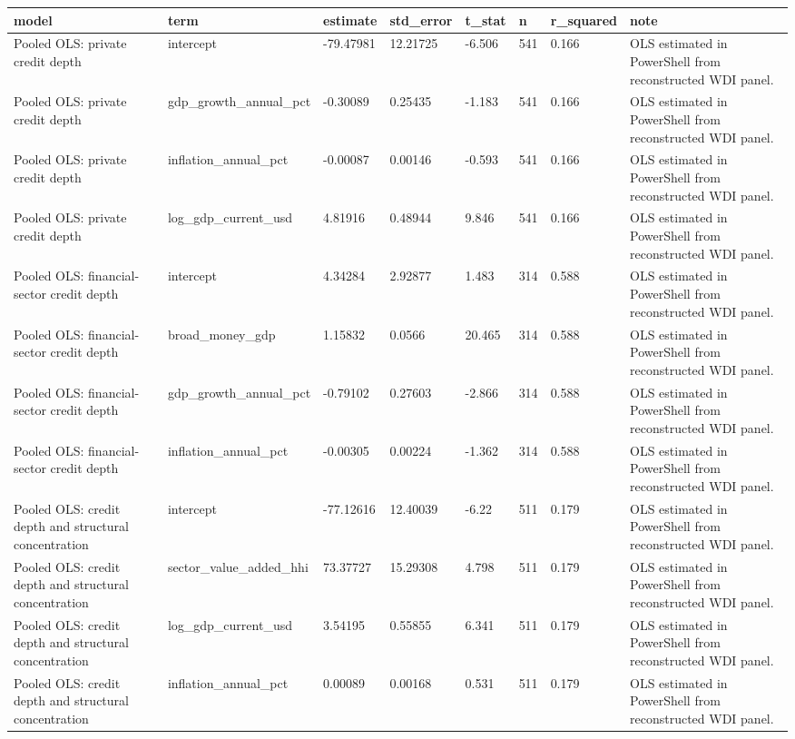﻿%
\begin{tabular}{llllllll}
\hline
model & term & estimate & std_error & t_stat & n & r_squared & note \\
\hline
Pooled OLS: private credit depth & intercept & -79.47981 & 12.21725 & -6.506 & 541 & 0.166 & OLS estimated in PowerShell from reconstructed WDI panel. \\
Pooled OLS: private credit depth & gdp\_growth\_annual\_pct & -0.30089 & 0.25435 & -1.183 & 541 & 0.166 & OLS estimated in PowerShell from reconstructed WDI panel. \\
Pooled OLS: private credit depth & inflation\_annual\_pct & -0.00087 & 0.00146 & -0.593 & 541 & 0.166 & OLS estimated in PowerShell from reconstructed WDI panel. \\
Pooled OLS: private credit depth & log\_gdp\_current\_usd & 4.81916 & 0.48944 & 9.846 & 541 & 0.166 & OLS estimated in PowerShell from reconstructed WDI panel. \\
Pooled OLS: financial-sector credit depth & intercept & 4.34284 & 2.92877 & 1.483 & 314 & 0.588 & OLS estimated in PowerShell from reconstructed WDI panel. \\
Pooled OLS: financial-sector credit depth & broad\_money\_gdp & 1.15832 & 0.0566 & 20.465 & 314 & 0.588 & OLS estimated in PowerShell from reconstructed WDI panel. \\
Pooled OLS: financial-sector credit depth & gdp\_growth\_annual\_pct & -0.79102 & 0.27603 & -2.866 & 314 & 0.588 & OLS estimated in PowerShell from reconstructed WDI panel. \\
Pooled OLS: financial-sector credit depth & inflation\_annual\_pct & -0.00305 & 0.00224 & -1.362 & 314 & 0.588 & OLS estimated in PowerShell from reconstructed WDI panel. \\
Pooled OLS: credit depth and structural concentration & intercept & -77.12616 & 12.40039 & -6.22 & 511 & 0.179 & OLS estimated in PowerShell from reconstructed WDI panel. \\
Pooled OLS: credit depth and structural concentration & sector\_value\_added\_hhi & 73.37727 & 15.29308 & 4.798 & 511 & 0.179 & OLS estimated in PowerShell from reconstructed WDI panel. \\
Pooled OLS: credit depth and structural concentration & log\_gdp\_current\_usd & 3.54195 & 0.55855 & 6.341 & 511 & 0.179 & OLS estimated in PowerShell from reconstructed WDI panel. \\
Pooled OLS: credit depth and structural concentration & inflation\_annual\_pct & 0.00089 & 0.00168 & 0.531 & 511 & 0.179 & OLS estimated in PowerShell from reconstructed WDI panel. \\
\hline
\end{tabular}

